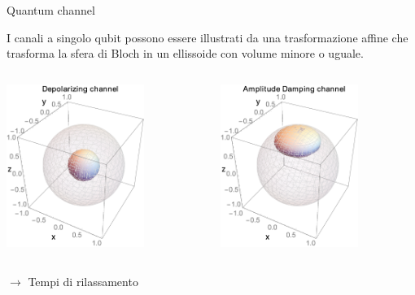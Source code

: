 \documentclass{beamer}
\renewcommand{\'}[0]{\`}
\begin{document}
	\begin{frame}{Quantum channel}	
	
	\small I canali a \alert{singolo qubit} possono essere illustrati da una trasformazione affine che trasforma la sfera di Bloch in un ellissoide con volume minore o uguale. 
	\vspace{0.4cm}
					
	\begin{columns}
		
	\centering \includegraphics[width=0.7\textwidth]{./image/depolarizing.eps}
	
	\centering \includegraphics[width=0.7\textwidth]{./image/amplitudedamping.eps}	
	
	\end{columns}
	
	\vspace{0.3cm} \pause
	
	\centering $\longrightarrow$ Tempi di rilassamento
	
	\end{frame}
					
\end{document}
